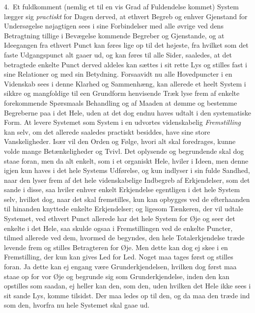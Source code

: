 \documentclass[12pt,a4paper]{book}
\newcommand{\apage}[1]{\marginnote{\footnotesize\textit{[#1]}}}
\begin{document}
4.~Et fuldkomment (nemlig et til en vis Grad af Fuldendelse kommet) System lægger
sig \emph{practiskt} for Dagen derved, at ethvert Begreb og enhver Gjenstand for
Undersøgelse nøjagtigen sees i sine Forbindelser med alle øvrige ved dens
Betragtning tillige i Bevægelse kommende Begreber og Gjenstande, og at Ideegangen
fra ethvert Punct kan føres lige op til det højeste, fra hvilket som det faste
Udgangspunct alt gaaer ud, og kan føres til alle Sider, saaledes, at det
betragtede enkelte Punct derved aldeles kan sættes i sit rette Lys og stilles fast
i sine Relationer og med sin Betydning. Forsaavidt nu alle Hovedpuncter i en
Videnskab sees i denne Klarhed og Sammenhæng, kan allerede et heelt System i sikkre
og mangfoldige til een Grundform henvisende Træk lyse frem af enkelte forekommende
Spørsmaals \apage{142}  Behandling og af Maaden at dømme og bestemme Begreberne paa i det Hele,
uden at det dog endnu haves udtalt i den systematiske Form. At levere Systemet som
System i en udvortes videnskabelig \emph{Fremstilling} kan selv, om det allerede
saaledes practiskt besiddes, have sine store Vanskeligheder. Især vil den Orden og
Følge, hvori alt skal foredrages, kunne volde mange Betænkeligheder og Tvivl. Det
oplysende og begrundende skal dog staae foran, men da alt enkelt, som i et
organiskt Hele, hviler i Ideen, men denne igjen kun haves i det hele Systems
Udførelse, og kun indlyser i sin fulde Sandhed, naar den lyser frem af det hele
videnskabelige Indbegreb af Erkjendelser, som det sande i disse, saa hviler enhver
enkelt Erkjendelse egentligen i det hele System selv, hvilket dog, naar det skal
fremstilles, kun kan opbygges ved de efterhaanden til hinanden knyttede enkelte
Erkjendelser; og ligesom Tænkeren, der vil udtale Systemet, ved ethvert Punct
allerede har det hele System for Øje og seer det enkelte i det Hele, saa skulde
ogsaa i Fremstillingen ved de enkelte Puncter, tilmed allerede ved dem, hvormed de
begyndes, den hele Totalerkjendelse træde levende frem og stilles Betragteren for
Øje. Men dette kan dog ej skee i en Fremstilling, der kun kan gives Led for Led.
Noget maa tages først og stilles foran. Ja dette kan ej engang være
Grunderkjendelsen, hvilken dog \apage{143} først maa staae op for vor Øje og begrunde sig som
Grunderkjendelse, inden den kan opstilles som saadan, ej heller kan den, som den,
uden hvilken det Hele ikke sees i sit sande Lys, komme tilsidst. Der maa ledes op
til den, og da maa den træde ind som den, hvorfra nu hele Systemet skal gaae ud.
\end{document}
